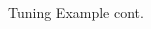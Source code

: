 \documentclass[11pt,compress,t,notes=noshow, xcolor=table]{beamer}
\begin{document}
\begin{frame}{Tuning Example cont.}
\begin{columns}
\begin{column}{0.6\textwidth}
\begin{figure}
  \end{figure}
\end{column}
\end{columns}


\end{frame}
\end{document}
